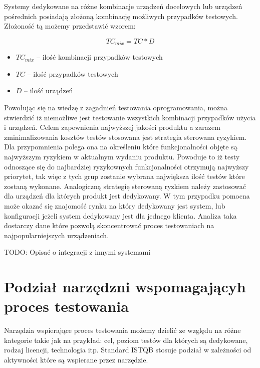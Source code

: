 Systemy dedykowane na różne kombinacje urządzeń docelowych lub urządzeń pośrednich posiadają złożoną kombinację możliwych przypadków testowych. Złożoność tą możemy przedstawić wzorem:

\begin{equation}
TC_{mix} = TC * D
\end{equation}
	\begin{itemize}
		\item $TC_{mix}$ -- ilość kombinacji przypadków testowych
		\item $TC$ -- ilość przypadków testowych
		\item $D$ -- ilość urządzeń
	\end{itemize}


Powołując się na wiedzę z zagadnień testowania oprogramowania, można stwierdzić iż niemożliwe jest testowanie wszystkich kombinacji przypadków użycia i urządzeń. Celem zapewnienia najwyższej jakości produktu a zarazem zminimalizowania kosztów testów stosowana jest strategia sterowana ryzykiem. Dla przypomnienia polega ona na określeniu które funkcjonalności objęte są najwyższym ryzykiem w aktualnym wydaniu produktu. Powoduje to iż testy odnoszące się do najbardziej ryzykownych funkcjonalności otrzymują najwyższy priorytet, tak więc z tych grup zostanie wybrana największa ilość testów które zostaną wykonane. Analogiczną strategię sterowaną ryzkiem należy zastosować dla urządzeń dla których produkt jest dedykowany. W tym przypadku pomocna może okazać się znajomość rynku na który dedykowany jest system, lub konfiguracji jeżeli system dedykowany jest dla jednego klienta. Analiza taka dostarczy dane które pozwolą skoncentrować proces testowaniach na najpopularniejszych urządzeniach. 

TODO: Opisać o integracji z innymi systemami
\section{Podział narzędzni wspomagającyh proces testowania}
Narzędzia wspierające proces testowania możemy dzielić ze względu na różne kategorie takie jak na przykład: cel, poziom testów dla których są dedykowane, rodzaj licencji, technologia itp. Standard ISTQB stosuje podział w zależności od aktywności które są wspierane przez narzędzie. 

